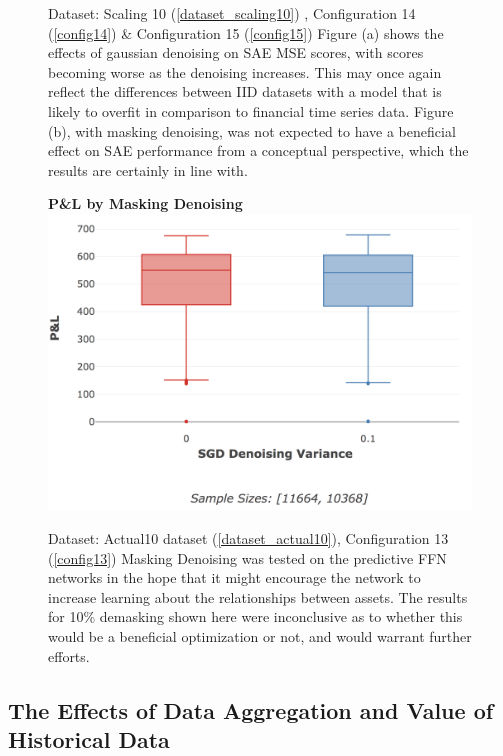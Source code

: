 \documentclass[a4paper,11pt,oneside]{article}
\theoremstyle{plain}
\theoremstyle{definition}
\begin{document}
\begin{figure}[H]
	\caption[Effects of Denoising on SAE MSE (Actual Data)]{Dataset: Scaling 10 (\ref{dataset_scaling10}) , Configuration 14 (\ref{config14}) \& Configuration 15 (\ref{config15})
		\newline Figure (a) shows the effects of gaussian denoising on SAE MSE scores, with scores becoming worse as the denoising increases. This may once again reflect the differences between IID datasets with a model that is likely to overfit in comparison to financial time series data. Figure (b), with masking denoising, was not expected to have a beneficial effect on SAE performance from a conceptual perspective, which the results are certainly in line with. }
	\label{figure-results_mse_denoising}
\end{figure}

\begin{figure}[H]
	\textbf{P\&L by Masking Denoising}
	\centering
	\includegraphics[scale=0.35]{images/results/network/denoising/actual_pl_masking.png}
	\caption[P\&L by Masking Denoising]{Dataset: Actual10 dataset (\ref{dataset_actual10}), Configuration 13 (\ref{config13})
		\newline Masking Denoising was tested on the predictive FFN networks in the hope that it might encourage the network to increase learning about the relationships between assets. The results for 10\% demasking shown here were inconclusive as to whether this would be a beneficial optimization or not, and would warrant further efforts.}
	\label{figure-actual_pl_masking}
\end{figure}



\newpage
\subsection{The Effects of Data Aggregation and Value of Historical Data}\label{results_hist}
\end{document}
